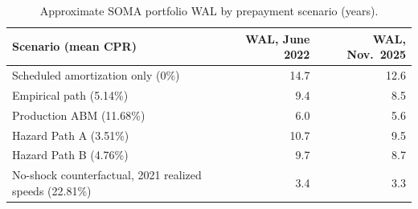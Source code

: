\documentclass[12pt]{article}
\begin{document}
\begin{table}[t]
\centering
\small
\begin{threeparttable}
\caption{Approximate SOMA portfolio WAL by prepayment scenario (years).}
\label{tab:wal}
\begin{tabular}{@{}lrr@{}}
\toprule
Scenario (mean CPR) & WAL, June 2022 & WAL, Nov.\ 2025 \\
\midrule
Scheduled amortization only (0\%) & 14.7 & 12.6 \\
Empirical path (5.14\%) & 9.4 & 8.5 \\
Production ABM (11.68\%) & 6.0 & 5.6 \\
Hazard Path A (3.51\%) & 10.7 & 9.5 \\
Hazard Path B (4.76\%) & 9.7 & 8.7 \\
No-shock counterfactual, 2021 realized speeds (22.81\%) & 3.4 & 3.3 \\
\bottomrule
\end{tabular}
\begin{tablenotes}[flushleft]\footnotesize

\end{tablenotes}
\end{threeparttable}
\end{table}
\end{document}
